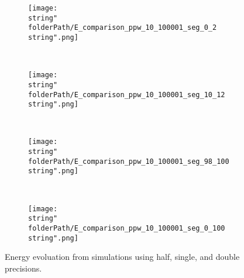 

\renewcommand{\folderPath}{\string"./fig/2D_example/marmousi2_101_401/nvidia_plot_dt_h_10_1p000404357910156e-03_6R_dt_s_10_1p000000047497451e-03_6R_dt_d_10_1p000000000000000e-03_6R/half_chop_D_chop_dx_chop_dt_single_double/\string"}




\begin{figure}[H]
\captionsetup{width=0.95\textwidth,font=footnotesize,labelfont=footnotesize}
\centering
%
\begin{subfigure}[b]{1\textwidth}
%
\centering\texttt{[image: \\string"\\folderPath/E\_comparison\_ppw\_10\_100001\_seg\_0\_2\\string".png]}
%
\end{subfigure}\hfill
\\[2ex]
%
\begin{subfigure}[b]{1\textwidth}
%
\centering\texttt{[image: \\string"\\folderPath/E\_comparison\_ppw\_10\_100001\_seg\_10\_12\\string".png]}
%
\end{subfigure}\hfill
\\[2ex]
%
\begin{subfigure}[b]{1\textwidth}
%
\centering\texttt{[image: \\string"\\folderPath/E\_comparison\_ppw\_10\_100001\_seg\_98\_100\\string".png]}
%
\end{subfigure}\hfill
\\[2ex]
%
\begin{subfigure}[b]{1\textwidth}
%
\centering\texttt{[image: \\string"\\folderPath/E\_comparison\_ppw\_10\_100001\_seg\_0\_100\\string".png]}
%
\end{subfigure}\hfill
%
\caption{Energy evoluation from simulations using half, single, and double precisions.}
\label{comparison_E_half_compensated_single_double_marmousi2_1e-3}
\end{figure}


